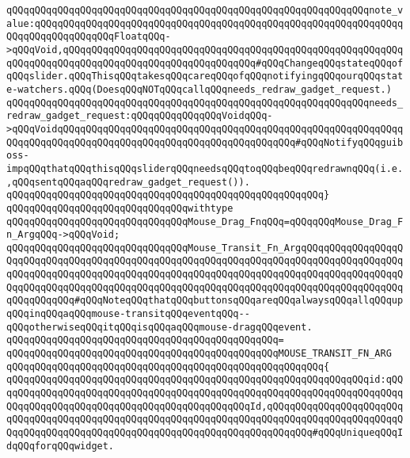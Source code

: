 \verb|qQQqqQQqqQQqqQQqqQQqqQQqqQQqqQQqqQQqqQQqqQQqqQQqqQQqqQQqqQQqqQQqnote_value:qQQqqQQqqQQqqQQqqQQqqQQqqQQqqQQqqQQqqQQqqQQqqQQqqQQqqQQqqQQqqQQqqQQqqQQqqQQqqQQqqQQqFloatqQQq->qQQqVoid,qQQqqQQqqQQqqQQqqQQqqQQqqQQqqQQqqQQqqQQqqQQqqQQqqQQqqQQqqQQqqQQqqQQqqQQqqQQqqQQqqQQqqQQqqQQqqQQqqQQqqQQq#qQQqChangeqQQqstateqQQqofqQQqslider.qQQqThisqQQqtakesqQQqcareqQQqofqQQqnotifyingqQQqourqQQqstate-watchers.qQQq(DoesqQQqNOTqQQqcallqQQqneeds_redraw_gadget_request.)|\newline
\verb|qQQqqQQqqQQqqQQqqQQqqQQqqQQqqQQqqQQqqQQqqQQqqQQqqQQqqQQqqQQqqQQqneeds_redraw_gadget_request:qQQqqQQqqQQqqQQqVoidqQQq->qQQqVoidqQQqqQQqqQQqqQQqqQQqqQQqqQQqqQQqqQQqqQQqqQQqqQQqqQQqqQQqqQQqqQQqqQQqqQQqqQQqqQQqqQQqqQQqqQQqqQQqqQQqqQQqqQQqqQQq#qQQqNotifyqQQqguiboss-impqQQqthatqQQqthisqQQqsliderqQQqneedsqQQqtoqQQqbeqQQqredrawnqQQq(i.e.,qQQqsentqQQqaqQQqredraw_gadget_request()).|\newline
\verb|qQQqqQQqqQQqqQQqqQQqqQQqqQQqqQQqqQQqqQQqqQQqqQQqqQQqqQQq}|\newline
\verb|qQQqqQQqqQQqqQQqqQQqqQQqqQQqqQQqwithtype|\newline
\verb|qQQqqQQqqQQqqQQqqQQqqQQqqQQqqQQqMouse_Drag_FnqQQq=qQQqqQQqMouse_Drag_Fn_ArgqQQq->qQQqVoid;|\newline
\newline
\newline
\newline
\verb|qQQqqQQqqQQqqQQqqQQqqQQqqQQqqQQqMouse_Transit_Fn_ArgqQQqqQQqqQQqqQQqqQQqqQQqqQQqqQQqqQQqqQQqqQQqqQQqqQQqqQQqqQQqqQQqqQQqqQQqqQQqqQQqqQQqqQQqqQQqqQQqqQQqqQQqqQQqqQQqqQQqqQQqqQQqqQQqqQQqqQQqqQQqqQQqqQQqqQQqqQQqqQQqqQQqqQQqqQQqqQQqqQQqqQQqqQQqqQQqqQQqqQQqqQQqqQQqqQQqqQQqqQQqqQQqqQQqqQQqqQQqqQQq#qQQqNoteqQQqthatqQQqbuttonsqQQqareqQQqalwaysqQQqallqQQqupqQQqinqQQqaqQQqmouse-transitqQQqeventqQQq--qQQqotherwiseqQQqitqQQqisqQQqaqQQqmouse-dragqQQqevent.|\newline
\verb|qQQqqQQqqQQqqQQqqQQqqQQqqQQqqQQqqQQqqQQqqQQqqQQq=|\newline
\verb|qQQqqQQqqQQqqQQqqQQqqQQqqQQqqQQqqQQqqQQqqQQqqQQqMOUSE_TRANSIT_FN_ARG|\newline
\verb|qQQqqQQqqQQqqQQqqQQqqQQqqQQqqQQqqQQqqQQqqQQqqQQqqQQqqQQq{|\newline
\verb|qQQqqQQqqQQqqQQqqQQqqQQqqQQqqQQqqQQqqQQqqQQqqQQqqQQqqQQqqQQqqQQqid:qQQqqQQqqQQqqQQqqQQqqQQqqQQqqQQqqQQqqQQqqQQqqQQqqQQqqQQqqQQqqQQqqQQqqQQqqQQqqQQqqQQqqQQqqQQqqQQqqQQqqQQqqQQqqQQqqQQqId,qQQqqQQqqQQqqQQqqQQqqQQqqQQqqQQqqQQqqQQqqQQqqQQqqQQqqQQqqQQqqQQqqQQqqQQqqQQqqQQqqQQqqQQqqQQqqQQqqQQqqQQqqQQqqQQqqQQqqQQqqQQqqQQqqQQqqQQqqQQqqQQqqQQq#qQQqUniqueqQQqIdqQQqforqQQqwidget.|\newline

